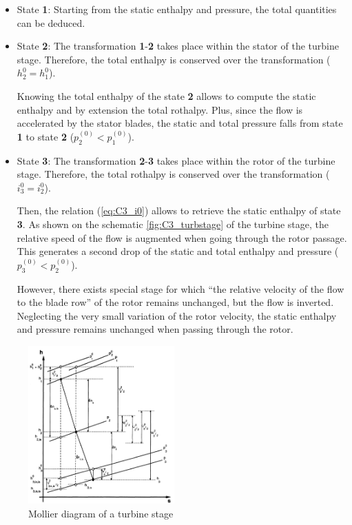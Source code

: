 \begin{itemize}
    \item State \textbf{1}: Starting from the static enthalpy and pressure, the total quantities can be deduced.
    \item State \textbf{2}: The transformation \textbf{1}-\textbf{2} takes place within the stator of the turbine stage. Therefore, the total enthalpy is conserved over the transformation ($h_2^0=h_1^0$).

          Knowing the total enthalpy of the state \textbf{2} allows to compute the static enthalpy and by extension the total rothalpy. Plus, since the flow is accelerated by the stator blades, the static and total pressure falls from state \textbf{1} to state \textbf{2} (\(p_2^{(0)}<p_1^{(0)}\)).
    \item State \textbf{3}: The transformation \textbf{2}-\textbf{3} takes place within the rotor of the turbine stage. Therefore, the total rothalpy is conserved over the transformation (\(i_3^0=i_2^0\)).

          Then, the relation (\ref{eq:C3_i0}) allows to retrieve the static enthalpy of state \textbf{3}. As shown on the schematic \ref{fig:C3_turbstage} of the turbine stage, the relative speed of the flow is augmented when going through the rotor passage. This generates a second drop of the static and total enthalpy and pressure (\(p_3^{(0)}<p_2^{(0)}\)).

          However, there exists special stage for which “the relative velocity of the flow to the blade row” of the rotor\cite{Hillewaert2019} remains unchanged, but the flow is inverted. Neglecting the very small variation of the rotor velocity, the static enthalpy and pressure remains unchanged when passing through the rotor.
\end{itemize}

\begin{figure}[h]
    \centering
    \includegraphics[width=0.5\textwidth]{Turb_mollier.png}
    \caption{Mollier diagram of a turbine stage \cite{Hillewaert2019}}
    \label{fig:C3_Mollierturb}
\end{figure}

